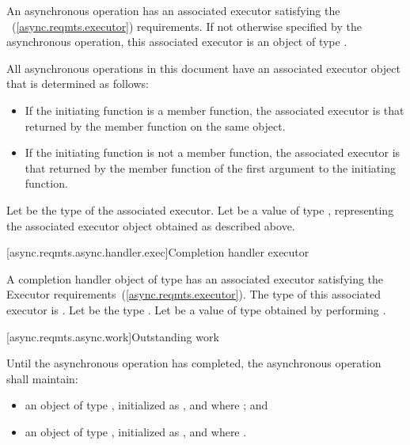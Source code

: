 %
\pnum
An asynchronous operation has an associated executor satisfying the ~(\ref{async.reqmts.executor}) requirements. If not otherwise specified by the asynchronous operation, this associated executor is an object of type .

\pnum
 All asynchronous operations in this document have an associated executor object that is determined as follows:

\begin{itemize}
\item
If the initiating function is a member function, the associated executor is that returned by the  member function on the same object.

\item
If the initiating function is not a member function, the associated executor is that returned by the  member function of the first argument to the initiating function.
\end{itemize}

\pnum
Let  be the type of the associated executor. Let  be a value of type , representing the associated executor object obtained as described above.



[async.reqmts.async.handler.exec]{Completion handler executor}

\pnum
A completion handler object of type 
has an associated executor
satisfying the Executor requirements~(\ref{async.reqmts.executor}).
The type of this associated executor is
.
Let  be the type
.
Let  be a value of type 
obtained by performing .



[async.reqmts.async.work]{Outstanding work}

%
\pnum
Until the asynchronous operation has completed, the asynchronous operation shall maintain:

\begin{itemize}
\item
an object  of type , initialized as , and where ; and

\item
an object  of type , initialized as , and where .
\end{itemize}



